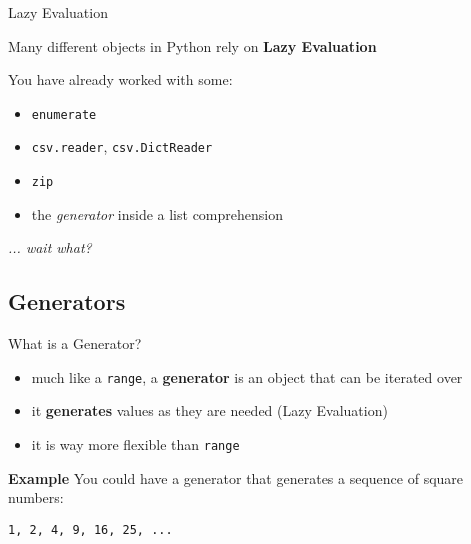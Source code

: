 \begin{frame}[fragile]{Lazy Evaluation}

    Many different objects in Python rely on {\bf Lazy Evaluation}

    \vspace{1em}

    You have already worked with some:

    \begin{itemize}
        \item {\tt enumerate}
        \item {\tt csv.reader}, {\tt csv.DictReader}
        \item {\tt zip}
        \item the {\it generator} inside a list comprehension
    \end{itemize}

    \vspace{1em}

    {\it ... wait what?}

\end{frame}

\subsection{Generators}


\begin{frame}{What is a Generator?}

    \begin{itemize}
        \item much like a {\tt range}, a {\bf generator} is an object that can be iterated over
        \item it {\bf generates} values as they are needed (Lazy Evaluation)
        \item it is way more flexible than {\tt range}
    \end{itemize}

    \vspace{1em}

    \begin{exampleblock}{{\bf Example}}
        You could have a generator that generates a sequence of square numbers:

        \vspace{0.5em}

        {\tt 1, 2, 4, 9, 16, 25, ...}
    \end{exampleblock}

\end{frame}

